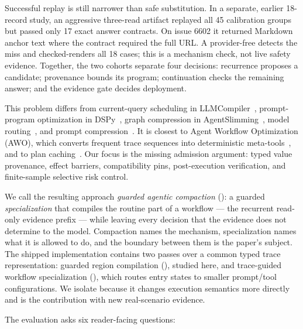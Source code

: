 Successful replay is still narrower than safe substitution. In a separate, earlier
18-record study, an aggressive three-read artifact replayed all 45 calibration groups but passed
only 17 exact answer contracts. On issue 6602 it returned Markdown anchor text where the
contract required the full URL. A provider-free  detects the miss
and checked-renders all 18 cases; this is a mechanism check, not live safety evidence.
Together, the two cohorts separate four decisions: recurrence proposes a candidate;
provenance bounds its program; continuation checks the remaining answer; and the evidence
gate decides deployment.

This problem differs from current-query scheduling in LLMCompiler~\cite{kim2024llmcompiler},
prompt-program optimization in DSPy~\cite{khattab2024dspy,opsahlong2024mipro}, graph
compression in AgentSlimming~\cite{chen2026agentslimming}, model routing~\cite{ong2025routellm},
and prompt compression~\cite{jiang2023llmlingua}.  It is closest to Agent Workflow
Optimization (AWO), which converts frequent trace sequences into deterministic
meta-tools~\cite{abuzakuk2026awo}, and to plan caching~\cite{zhang2025plancache}.  Our
focus is the missing admission argument: typed value provenance, effect barriers,
compatibility pins, post-execution verification, and finite-sample selective risk control.

We call the resulting approach \emph{guarded agentic compaction} (\method): a guarded
\emph{specialization} that compiles the routine part of a workflow --- the recurrent
read-only evidence prefix --- while leaving every decision that the evidence does not
determine to the model.  Compaction names the mechanism, specialization names what it is
allowed to do, and the boundary between them is the paper's subject.  The shipped
implementation contains two passes over a common typed trace representation: guarded
region compilation (\grc), studied here, and trace-guided workflow specialization
(\tgws), which routes entry states to smaller prompt/tool configurations.  We isolate
\grc because it changes execution semantics more directly and is the contribution with
new real-scenario evidence.

The evaluation asks six reader-facing questions:


